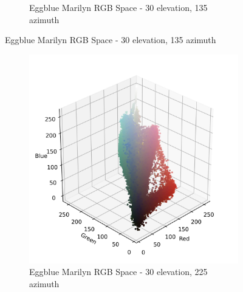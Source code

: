 \documentclass{article}
\begin{document}
\begin{figure}[ht]
\begin{subfigure}{0.45\textwidth}
    \caption{Eggblue Marilyn RGB Space - 30 \degree elevation, 135 \degree azimuth}
    \label{fig:4_18_eggblue_marilyn_original_scatter}
  \end{subfigure}
  \label{fig:eggblue_marilyn_original_scatter_1}
\end{figure}

\begin{figure}[ht]\ContinuedFloat
  \centering
  \begin{subfigure}{0.45\textwidth}
    \includegraphics[width=\textwidth]{main_files/figure-latex/4_19_eggblue_marilyn_original_scatter.jpg}
    \caption{Eggblue Marilyn RGB Space - 30 \degree elevation, 225 \degree azimuth}
    \label{fig:4_19_eggblue_marilyn_original_scatter}
  \end{subfigure}
  \hfill
  \begin{subfigure}{0.45\textwidth}

\end{subfigure}
\end{figure}
\end{document}
